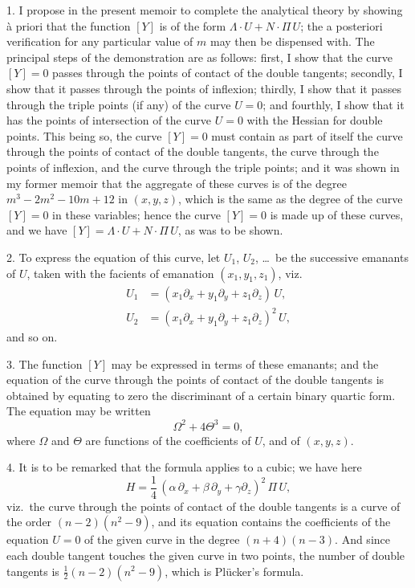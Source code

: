 \documentclass[11pt,a4paper]{book}
\begin{document}
1. I propose in the present memoir to complete the analytical theory by showing \`{a} priori that the function $[Y]$ is of the form $\Lambda \cdot U + N \cdot \Pi\,U$; the a posteriori verification for any particular value of $m$ may then be dispensed with. The principal steps of the demonstration are as follows: first, I show that the curve $[Y]=0$ passes through the points of contact of the double tangents; secondly, I show that it passes through the points of inflexion; thirdly, I show that it passes through the triple points (if any) of the curve $U=0$; and fourthly, I show that it has the points of intersection of the curve $U=0$ with the Hessian for double points. This being so, the curve $[Y]=0$ must contain as part of itself the curve through the points of contact of the double tangents, the curve through the points of inflexion, and the curve through the triple points; and it was shown in my former memoir that the aggregate of these curves is of the degree $m^3-2m^2-10m+12$ in $(x, y, z)$, which is the same as the degree of the curve $[Y]=0$ in these variables; hence the curve $[Y]=0$ is made up of these curves, and we have $[Y] = \Lambda \cdot U + N \cdot \Pi\,U$, as was to be shown.

2. To express the equation of this curve, let $U_1$, $U_2$, \ldots\ be the successive emanants of $U$, taken with the facients of emanation $(x_1, y_1, z_1)$, viz.
\begin{align*}
U_1 &= (x_1\partial_x + y_1\partial_y + z_1\partial_z)\,U, \\
U_2 &= (x_1\partial_x + y_1\partial_y + z_1\partial_z)^2\,U,
\end{align*}
and so on.

3. The function $[Y]$ may be expressed in terms of these emanants; and the equation of the curve through the points of contact of the double tangents is obtained by equating to zero the discriminant of a certain binary quartic form. The equation may be written
\[
\Omega^2 + 4\Theta^3 = 0,
\]
where $\Omega$ and $\Theta$ are functions of the coefficients of $U$, and of $(x, y, z)$.

4. It is to be remarked that the formula applies to a cubic; we have here
\[
H = \frac{1}{4}\,(\alpha\,\partial_x + \beta\,\partial_y + \gamma\partial_z)^2\, \Pi\,U,
\]
viz.\ the curve through the points of contact of the double tangents is a curve of the order $(n-2)(n^2-9)$, and its equation contains the coefficients of the equation $U=0$ of the given curve in the degree $(n+4)(n-3)$. And since each double tangent touches the given curve in two points, the number of double tangents is $\frac{1}{2}(n-2)(n^2-9)$, which is Pl\"{u}cker's formula.
\end{document}
